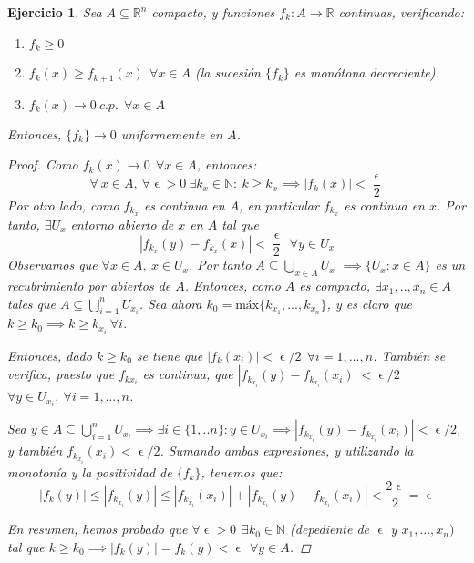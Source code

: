 \documentclass[11pt, a4paper]{article}
\let\epsilon\upvarepsilon
\newcommand{\R}{\mathbb{R}}
\newcommand{\N}{\mathbb{N}}
\theoremstyle{theorem-style}
\theoremstyle{definition-style}
\newtheorem{ejer}{Ejercicio}[section]
\theoremstyle{remark-style}
\theoremstyle{example-style}
\newenvironment{nlist}
{\begin{enumerate}
    \renewcommand\labelenumi{(\emph{\roman{enumi})}}}
  {\end{enumerate}}
\begin{document}
\begin{ejer}
  \label{1}
  Sea $A\subseteq \R^n$ compacto, y funciones $f_k : A \to \mathbb{R}$ continuas, verificando:

  \begin{nlist}
  \item $f_k \geq 0$
  \item $f_k(x) \geq f_{k+1}(x)\ \ \forall x \in A$ (la sucesión $\{f_k\}$ es monótona decreciente).
  \item $f_k(x) \to 0\ c.p.\ \ \forall x \in A$
  \end{nlist}

  Entonces, $\{f_k\} \to 0$ uniformemente en $A$.

  \begin{proof}
    Como $f_k(x) \to 0\ \ \forall x \in A$, entonces:  $$\forall \ x \in A,\ \forall \epsilon >0\ \exists k_x \in \mathbb{N}:\ k\geq k_x \implies |f_k(x)| < \frac{\epsilon}{2}$$
    Por otro lado, como $f_{k_x}$ es continua en $A$, en particular $f_{k_x}$ es continua en $x$. Por tanto, $\exists U_x$ entorno abierto de $x$ en $A$ tal que $$|f_{k_x}(y) - f_{k_x}(x)| < \frac{\epsilon}{2}\ \ \forall y \in U_x$$
    Observamos que $\forall x \in A, \ x \in U_x$. Por tanto $A \subseteq \bigcup_{x\in A} U_x$ $\implies \{U_x: x\in A\}$ es un recubrimiento por abiertos de $A$. Entonces, como $A$ es compacto, $\exists x_1,..,x_n \in A$ tales que $A \subseteq \bigcup_{i=1}^{n} U_{x_{i}}$. Sea ahora $k_0 = \text{máx}\{k_{x_1},...,k_{x_n}\}$, y es claro que $k \ge k_0 \implies k \ge k_{x_i}\ \forall i$.

    Entonces, dado $k \ge k_0$ se tiene que $|f_k(x_i)| < \epsilon/2 \ \ \forall i = 1,\dots,n$. También se verifica, puesto que $f_{k{x_i}}$ es continua, que  $|f_{k_{x_i}} (y) - f_{k_{x_i}}(x_i)| < \epsilon/2$ \ \ $\forall y \in U_{x_i}, \ \forall i = 1,\dots,n$.

    Sea $y \in A \subseteq \bigcup_{i=1}^n U_{x_i} \implies \exists i \in \{1,..n\}: y \in U_{x_i} \implies |f_{k_{x_i}}(y) - f_{k_{x_i}}(x_i)| < \epsilon/2$, y también $f_{k_{x_i}}(x_i) < \epsilon/2$. Sumando ambas expresiones, y utilizando la monotonía y la positividad de $\{f_k\}$, tenemos que: $$|f_k(y)| \leq |f_{k_{x_i}}(y)| \leq |f_{k_{x_i}} (x_i)| + |f_{k_{x_i}} (y) - f_{k_{x_i}}(x_i)| < \frac{2\epsilon}{2} = \epsilon$$

    En resumen, hemos probado que $\forall \epsilon > 0 \ \ \exists k_0 \in \N$ (depediente de $\epsilon$ y $x_1,..., x_n)$ tal que $k\geq k_0 \implies |f_k(y)| = f_k(y) < \epsilon \ \ \forall y \in A$.
  \end{proof}
\end{ejer}
\end{document}

